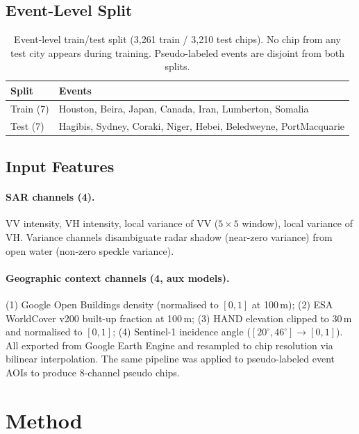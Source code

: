 \documentclass[10pt,twocolumn]{article}
\begin{document}
\subsection{Event-Level Split}

\begin{table}[h]
\centering\small
\caption{Event-level train/test split (3,261 train / 3,210 test chips).
  No chip from any test city appears during training.
  Pseudo-labeled events are disjoint from both splits.}
\label{tab:split}
\begin{tabularx}{\columnwidth}{lX}
\toprule
Split & Events \\
\midrule
Train (7) & Houston, Beira, Japan, Canada, Iran, Lumberton, Somalia \\
Test  (7) & Hagibis, Sydney, Coraki, Niger, Hebei, Beledweyne, PortMacquarie \\
\bottomrule
\end{tabularx}
\end{table}

\subsection{Input Features}

\paragraph{SAR channels (4).}
VV intensity, VH intensity, local variance of VV ($5{\times}5$ window),
local variance of VH.  Variance channels disambiguate radar shadow
(near-zero variance) from open water (non-zero speckle variance).

\paragraph{Geographic context channels (4, aux models).}
(1) Google Open Buildings density (normalised to $[0,1]$ at 100\,m);
(2) ESA WorldCover v200 built-up fraction at 100\,m;
(3) HAND elevation clipped to 30\,m and normalised to $[0,1]$;
(4) Sentinel-1 incidence angle ($[20^\circ, 46^\circ] \to [0,1]$).
All exported from Google Earth Engine and resampled to chip resolution
via bilinear interpolation.  The same pipeline was applied to
pseudo-labeled event AOIs to produce 8-channel pseudo chips.

\section{Method}
\end{document}
